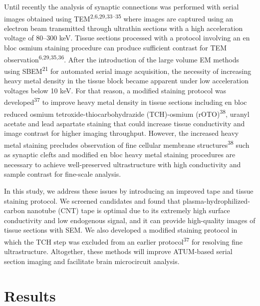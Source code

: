 \documentclass{article}
\begin{document}
Until recently the analysis of synaptic connections was performed with serial images obtained using TEM\textsuperscript{2,6,29,33–35} where images are captured using an electron beam transmitted through ultrathin sections with a high acceleration voltage of 80–300 keV. Tissue sections processed with a protocol involving an en bloc osmium staining procedure can produce sufficient contrast for TEM observation\textsuperscript{6,29,35,36}. After the introduction of the large volume EM methods using SBEM\textsuperscript{21} for automated serial image acquisition, the necessity of increasing heavy metal density in the tissue block became apparent under low acceleration voltages below 10 keV. For that reason, a modified staining protocol was developed\textsuperscript{37} to improve heavy metal density in tissue sections including en bloc reduced osmium tetroxide-thiocarbohydrazide (TCH)-osmium (rOTO)\textsuperscript{38}, uranyl acetate and lead aspartate staining that could increase tissue conductivity and image contrast for higher imaging throughput. However, the increased heavy metal staining precludes observation of fine cellular membrane structures\textsuperscript{38} such as synaptic clefts and modified en bloc heavy metal staining procedures are necessary to achieve well-preserved ultrastructure with high conductivity and sample contrast for fine-scale analysis.

In this study, we address these issues by introducing an improved tape and tissue staining protocol. We screened candidates and found that plasma-hydrophilized-carbon nanotube (CNT) tape is optimal due to its extremely high surface conductivity and low endogenous signal, and it can provide high-quality images of tissue sections with SEM. We also developed a modified staining protocol in which the TCH step was excluded from an earlier protocol\textsuperscript{37} for resolving fine ultrastructure. Altogether, these methods will improve ATUM-based serial section imaging and facilitate brain microcircuit analysis.

\section*{Results}
\end{document}
